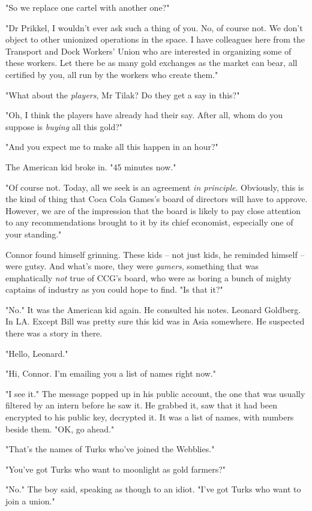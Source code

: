 "So we replace one cartel with another one?"

"Dr Prikkel, I wouldn't ever ask such a thing of you. No, of course
not. We don't object to other unionized operations in the space. I
have colleagues here from the Transport and Dock Workers' Union who
are interested in organizing some of these workers. Let there be as
many gold exchanges as the market can bear, all certified by you,
all run by the workers who create them."

"What about the \emph{players}, Mr Tilak? Do they get a say in
this?"

"Oh, I think the players have already had their say. After all,
whom do you suppose is \emph{buying} all this gold?"

"And you expect me to make all this happen in an hour?"

The American kid broke in. "45 minutes now."

"Of course not. Today, all we seek is an agreement
\emph{in principle}. Obviously, this is the kind of thing that Coca
Cola Games's board of directors will have to approve. However, we
are of the impression that the board is likely to pay close
attention to any recommendations brought to it by its chief
economist, especially one of your standing."

Connor found himself grinning. These kids -- not just kids, he
reminded himself -- were gutsy. And what's more, they were
\emph{gamers}, something that was emphatically \emph{not} true of
CCG's board, who were as boring a bunch of mighty captains of
industry as you could hope to find. "Is that it?"

"No." It was the American kid again. He consulted his notes.
Leonard Goldberg. In LA. Except Bill was pretty sure this kid was
in Asia somewhere. He suspected there was a story in there.

"Hello, Leonard."

"Hi, Connor. I'm emailing you a list of names right now."

"I see it." The message popped up in his public account, the one
that was usually filtered by an intern before he saw it. He grabbed
it, saw that it had been encrypted to his public key, decrypted it.
It was a list of names, with numbers beside them. "OK, go ahead."

"That's the names of Turks who've joined the Webblies."

"You've got Turks who want to moonlight as gold farmers?"

"No." The boy said, speaking as though to an idiot. "I've got Turks
who want to join a union."

